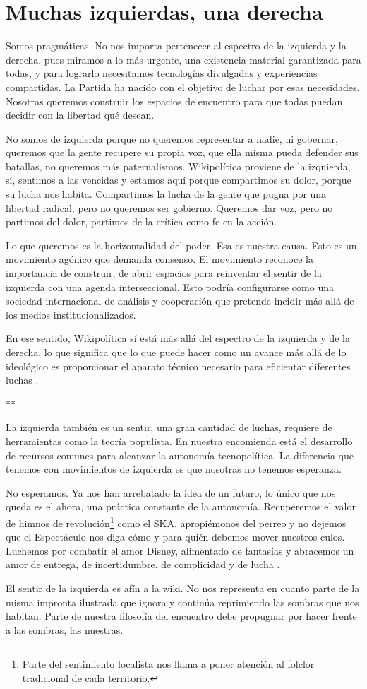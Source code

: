 \hypertarget{muchas-izquierdas-una-derecha}{%
\section{Muchas izquierdas, una
derecha}\label{muchas-izquierdas-una-derecha}}

Somos pragmáticas. No nos importa pertenecer al espectro de la izquierda
y la derecha, pues miramos a lo más urgente, una existencia material
garantizada para todas, y para lograrlo necesitamos tecnologías
divulgadas y experiencias compartidas. La Partida ha nacido con el
objetivo de luchar por esas necesidades. Nosotras queremos construir los
espacios de encuentro para que todas puedan decidir con la libertad qué
desean.

No somos de izquierda porque no queremos representar a nadie, ni
gobernar, queremos que la gente recupere su propia voz, que ella misma
pueda defender sus batallas, no queremos más paternalismos. Wikipolítica
proviene de la izquierda, sí, sentimos a las vencidas y estamos aquí
porque compartimos su dolor, porque su lucha nos habita. Compartimos la
lucha de la gente que pugna por una libertad radical, pero no queremos
ser gobierno. Queremos dar voz, pero no partimos del dolor, partimos de
la crítica como fe en la acción.

Lo que queremos es la horizontalidad del poder. Esa es nuestra causa.
Esto es un movimiento agónico que demanda consenso. El movimiento
reconoce la importancia de construir, de abrir espacios para reinventar
el sentir de la izquierda con una agenda interseccional. Esto podría
configurarse como una sociedad internacional de análisis y cooperación
que pretende incidir más allá de los medios institucionalizados.

En ese sentido, Wikipolítica sí está más allá del espectro de la
izquierda y de la derecha, lo que significa que lo que puede hacer como
un avance más allá de lo ideológico es proporcionar el aparato técnico
necesario para eficientar diferentes
luchas \cite{Tiqqun2014}.

**

La izquierda también es un sentir, una gran cantidad de luchas, requiere
de herramientas como la teoría populista. En nuestra encomienda está el
desarrollo de recursos comunes para alcanzar la autonomía tecnopolítica.
La diferencia que tenemos con movimientos de izquierda es que nosotras
no tenemos esperanza.

No esperamos. Ya nos han arrebatado la idea de un futuro, lo único que
nos queda es el ahora, una práctica constante de la autonomía.
Recuperemos el valor de himnos de revolución\footnote{Parte del
  sentimiento localista nos llama a poner atención al folclor
  tradicional de cada territorio.} como el SKA, apropiémonos del perreo
y no dejemos que el Espectáculo nos diga cómo y para quién debemos mover
nuestros culos. Luchemos por combatir el amor Disney, alimentado de
fantasías y abracemos un amor de entrega, de incertidumbre, de
complicidad y de lucha \cite{Vasallo2014}.

El sentir de la izquierda es afín a la wiki. No nos representa en cuanto
parte de la misma impronta ilustrada que ignora y continúa reprimiendo
las sombras que nos habitan. Parte de nuestra filosofía del encuentro
debe propugnar por hacer frente a las sombras, las nuestras.
